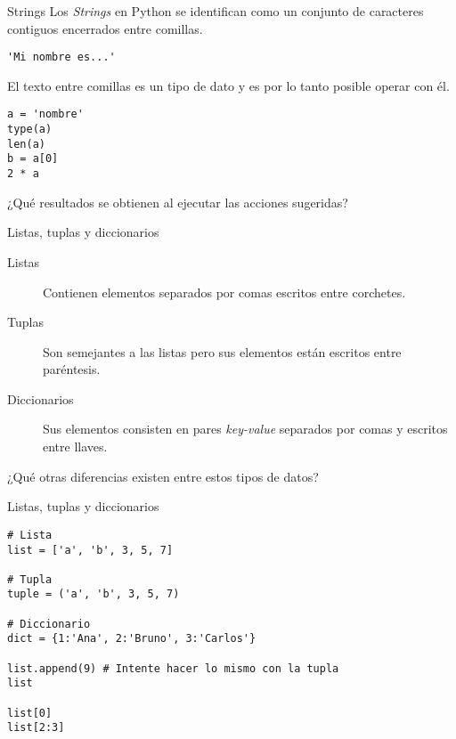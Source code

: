 \documentclass[10pt]{beamer}
\begin{document}
\begin{frame}[fragile]{Strings}
Los \emph{Strings} en Python se identifican como un conjunto de caracteres contiguos encerrados entre comillas.
\begin{verbatim}
'Mi nombre es...' 
\end{verbatim}
El texto entre comillas es un tipo de dato y es por lo tanto posible operar con él.
\begin{verbatim}
a = 'nombre'
type(a)
len(a)
b = a[0]
2 * a 
\end{verbatim}

\begin{center}
	¿Qué resultados se obtienen al ejecutar las acciones sugeridas?
\end{center}
\end{frame}

\begin{frame}[fragile]{Listas, tuplas y diccionarios}
	\begin{description}
		\item[Listas] Contienen elementos separados por comas escritos entre corchetes.
		\item[Tuplas] Son semejantes a las listas pero sus elementos están escritos entre paréntesis.
		\item[Diccionarios] Sus elementos consisten en pares \emph{key-value} separados por comas y escritos entre llaves.
	\end{description}

\vspace{1em}

\begin{center}
	¿Qué otras diferencias existen entre estos tipos de datos?
\end{center}
\end{frame}

\begin{frame}[fragile]{Listas, tuplas y diccionarios}
	\begin{verbatim}
# Lista 
list = ['a', 'b', 3, 5, 7]
	
# Tupla
tuple = ('a', 'b', 3, 5, 7) 

# Diccionario
dict = {1:'Ana', 2:'Bruno', 3:'Carlos'}

list.append(9) # Intente hacer lo mismo con la tupla
list 

list[0]
list[2:3]
	\end{verbatim}
\end{frame}
\end{document}
